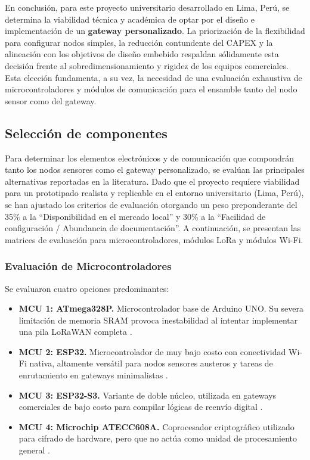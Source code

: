 En conclusión, para este proyecto universitario desarrollado en Lima, Perú, se determina la viabilidad técnica y académica de optar por el diseño e implementación de un \textbf{gateway personalizado}. La priorización de la flexibilidad para configurar nodos simples, la reducción contundente del CAPEX y la alineación con los objetivos de diseño embebido respaldan sólidamente esta decisión frente al sobredimensionamiento y rigidez de los equipos comerciales. Esta elección fundamenta, a su vez, la necesidad de una evaluación exhaustiva de microcontroladores y módulos de comunicación para el ensamble tanto del nodo sensor como del gateway.

\subsection{Selección de componentes}

Para determinar los elementos electrónicos y de comunicación que compondrán tanto los nodos sensores como el gateway personalizado, se evalúan las principales alternativas reportadas en la literatura. Dado que el proyecto requiere viabilidad para un prototipado realista y replicable en el entorno universitario (Lima, Perú), se han ajustado los criterios de evaluación otorgando un peso preponderante del 35\% a la ``Disponibilidad en el mercado local'' y 30\% a la ``Facilidad de configuración / Abundancia de documentación''. A continuación, se presentan las matrices de evaluación para microcontroladores, módulos LoRa y módulos Wi-Fi.

\subsubsection{Evaluación de Microcontroladores}

Se evaluaron cuatro opciones predominantes:
\begin{itemize}
    \item \textbf{MCU 1: ATmega328P.} Microcontrolador base de Arduino UNO. Su severa limitación de memoria SRAM provoca inestabilidad al intentar implementar una pila LoRaWAN completa \cite{nb_mcu_1, nb_mcu_3}.
    \item \textbf{MCU 2: ESP32.} Microcontrolador de muy bajo costo con conectividad Wi-Fi nativa, altamente versátil para nodos sensores austeros y tareas de enrutamiento en gateways minimalistas \cite{nb_mcu_4, nb_mcu_6}.
    \item \textbf{MCU 3: ESP32-S3.} Variante de doble núcleo, utilizada en gateways comerciales de bajo costo para compilar lógicas de reenvío digital \cite{nb_mcu_6}.
    \item \textbf{MCU 4: Microchip ATECC608A.} Coprocesador criptográfico utilizado para cifrado de hardware, pero que no actúa como unidad de procesamiento general \cite{nb_mcu_8}.
\end{itemize}

